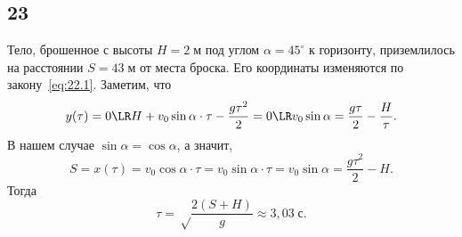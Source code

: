 \subsection{23}

Тело, брошенное с высоты $H=2\;\text{м}$ под углом $\alpha=45^\circ$ к горизонту, приземлилось на расстоянии $S=43\;\text{м}$ от места броска. Его координаты изменяются по закону~\eqref{eq:22.1}. Заметим, что
\[
y(\tau)=0\LR H+v_0\sin\alpha\cdot\tau-\frac{g\tau^2}{2}=0\LR v_0\sin\alpha=\frac{g\tau}{2}-\frac{H}{\tau}.
\]
В нашем случае $\sin\alpha=\cos\alpha$, а значит,
\[
S=x(\tau)=v_0\cos\alpha\cdot\tau=v_0\sin\alpha\cdot\tau=v_0\sin\alpha=\frac{g\tau^2}{2}-H.
\]
Тогда
\[
\tau=\sqrt\frac{2(S+H)}{g}\approx3{,}03\;\text{с}.
\]
